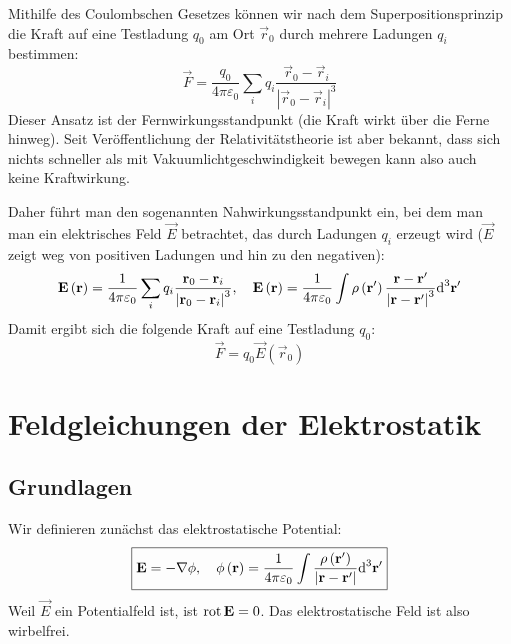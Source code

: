 Mithilfe des Coulombschen Gesetzes können wir nach dem Superpositionsprinzip die Kraft auf eine Testladung $q_{0}$ am Ort $\vec {r}_{0}$ durch mehrere Ladungen $q_{i}$ bestimmen:
\begin{equation}
	\label{3.2}
	\vec {F}=\frac{q_{0}}{4\pi \varepsilon _{0}}\sum _{i}q_{i}\frac{\vec {r}_{0}-\vec {r}_{i}}{\left| \vec {r}_{0}-\vec {r}_{i}\right| ^{3}}
\end{equation}
Dieser Ansatz ist der Fernwirkungsstandpunkt (die Kraft wirkt über die Ferne hinweg). Seit Veröffentlichung der Relativitätstheorie ist aber bekannt, dass sich nichts schneller als mit Vakuumlichtgeschwindigkeit bewegen kann \textendash{} also auch keine Kraftwirkung. 

Daher führt man den sogenannten Nahwirkungsstandpunkt ein, bei dem man man ein elektrisches Feld $\vec {E}$ betrachtet, das durch Ladungen $q_{i}$ erzeugt wird ($\vec {E}$ zeigt weg von positiven Ladungen und hin zu den negativen):
\begin{equation}
	\mathbf{E}\left(\mathbf{r}\right)=\frac{1}{4\pi \varepsilon _{0}}\sum _{i}q_{i}\frac{\mathbf{r}_{0}-\mathbf{r}_{i}}{\left| \mathbf{r}_{0}-\mathbf{r}_{i}\right| ^{3}},\quad \mathbf{E}\left(\mathbf{r}\right)=\frac{1}{4\pi \varepsilon _{0}}\int \rho \left(\mathbf{r}'\right)\frac{\mathbf{r}-\mathbf{r}'}{\left| \mathbf{r}-\mathbf{r}'\right| ^{3}}\text{d} ^{3}\mathbf{r}'
\end{equation}
Damit ergibt sich die folgende Kraft auf eine Testladung $q_{0}$:
\begin{equation}
	\vec {F}=q_{0}\vec {E}\left(\vec {r}_{0}\right)
\end{equation}


\section{Feldgleichungen der Elektrostatik}

\subsection{Grundlagen}

Wir definieren zunächst das elektrostatische Potential:
\begin{equation}
	\label{3.3}
	\boxed{\mathbf{E}=-\nabla \phi ,\quad \phi \left(\mathbf{r}\right)=\frac{1}{4\pi \varepsilon _{0}}\int \frac{\rho \left(\mathbf{r}'\right)}{\left| \mathbf{r}-\mathbf{r}'\right| }\text{d} ^{3}\mathbf{r}'}
\end{equation}
Weil $\vec {E}$ ein Potentialfeld ist, ist $\operatorname{rot} \mathbf{E}=0$. Das elektrostatische Feld ist also wirbelfrei.

